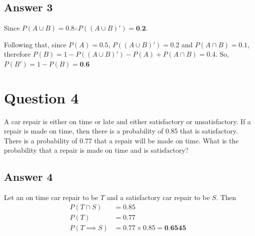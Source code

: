 \documentclass[
	11pt, %
]{assignment}
\begin{document}
\subsection*{Answer 3}
Since \(P(A \cup B) = 0.8 \therefore P((A \cup B)') = \textbf{0.2}\).

Following that, since \(P(A) = 0.5\), \(P((A \cup B)') = 0.2\) and \(P(A\cap B) = 0.1\), therefore \(P(B) = 1 - P((A \cup B)') - P(A) + P(A \cap B) = 0.4\). So, \(P(B') = 1 - P(B) = \textbf{0.6}\)

\section*{Question 4}
\begin{problem}
A car repair is either on time or late and either satisfactory or unsatisfactory. If a repair is made on time, then there is a probability of 0.85 that is satisfactory. There is a probability of 0.77 that a repair will be made on time. What is the probability that a repair is made on time and is satisfactory?
\end{problem}

\subsection*{Answer 4}
Let an on time car repair to be \(T\) and a satisfactory car repair to be \(S\). Then
\[
	\begin{aligned}
		P(T \cap S)     & = 0.85                               \\
		P(T)            & = 0.77                               \\
		P(T \implies S) & = 0.77 \times 0.85 = \textbf{0.6545} \\
	\end{aligned}
\]
\end{document}
